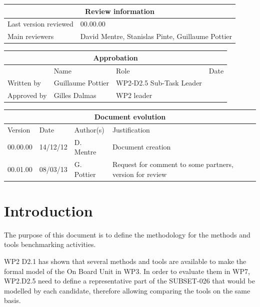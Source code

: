 \documentclass{template/openetcs_report}
\begin{document}
\begin{tabular}{|p{4.4cm}|p{8.7cm}|}
\hline
\multicolumn{2}{|c|}{Review information} \\
\hline
Last version reviewed & 00.00.00 \\
\hline
Main reviewers &  David Mentre, Stanislas Pinte, Guillaume Pottier \\
\hline
\end{tabular}

\begin{tabular}{|p{2.2cm}|p{4cm}|p{4cm}|p{2cm}|}
\hline
\multicolumn{4}{|c|}{Approbation} \\
\hline
  &  Name & Role & Date   \\
\hline  
Written by    &  Guillaume Pottier & WP2-D2.5 Sub-Task Leader  & \\
\hline
Approved by & Gilles Dalmas & WP2 leader & \\
\hline
\end{tabular}

\begin{tabular}{|p{2.2cm}|p{2cm}|p{3cm}|p{5cm}|}
\hline
\multicolumn{4}{|c|}{Document evolution} \\
\hline
Version &  Date & Author(s) & Justification  \\
\hline  
00.00.00 & 14/12/12 & D. Mentre &  Document creation  \\
\hline  
00.01.00 & 08/03/13 & G. Pottier &  Request for comment to some partners, version for review  \\
\hline
\end{tabular}



\tableofcontents
\listoffiguresandtables




\mainmatter

\chapter{Introduction}

The purpose of this document is to define the methodology for the methods and tools benchmarking activities.

WP2 D2.1 has shown that several methods and tools are available to make the formal model of the On Board Unit in WP3. In order to evaluate them in WP7, WP2.D2.5 need to define a representative part of the SUBSET-026 that would be modelled by each candidate, therefore allowing comparing the tools on the same basis.
\end{document}
